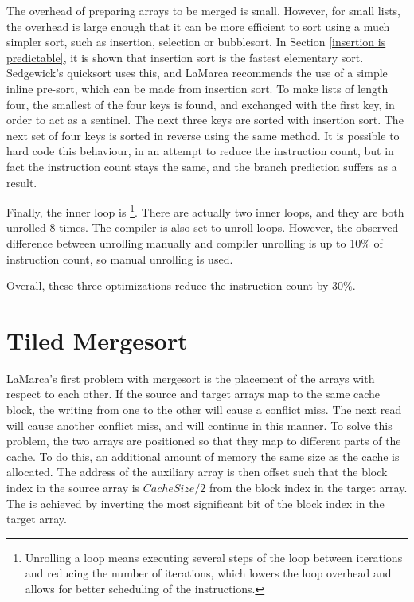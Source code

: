 The overhead of preparing arrays to be merged is small. However, for small
lists, the overhead is large enough that it can be more efficient to sort using
a much simpler sort, such as insertion, selection or bubblesort. In Section
\ref{insertion is predictable}, it is shown that insertion sort is the fastest
elementary sort.  Sedgewick's quicksort uses this, and LaMarca recommends the
use of a simple inline pre-sort, which can be made from insertion sort. To make
lists of length four, the smallest of the four keys is found, and exchanged
with the first key, in order to act as a sentinel. The next three keys are
sorted with insertion sort. The next set of four keys is sorted in reverse
using the same method. It is possible to hard code this behaviour, in an attempt
to reduce the instruction count, but in fact the instruction count stays the
same, and the branch prediction suffers as a result.

Finally, the inner loop is \footnote{Unrolling a loop means
executing several steps of the loop between iterations and reducing the number
of iterations, which lowers the loop overhead and allows for better scheduling
of the instructions.}. There are actually two inner loops, and they are both
unrolled 8 times. The compiler is also set to unroll loops. However, the
observed difference between unrolling manually and compiler unrolling is up to
10\% of instruction count, so manual unrolling is used.

Overall, these three optimizations reduce the instruction count by 30\%.

\section{Tiled Mergesort}
\label{tiled mergesort}
LaMarca's first problem with mergesort is the placement of the arrays with
respect to each other. If the source and target arrays map to the same cache
block, the writing from one to the other will cause a conflict miss. The next
read will cause another conflict miss, and will continue in this manner. To
solve this problem, the two arrays are positioned so that they map to different
parts of the cache. To do this, an additional amount of memory the same size as
the cache is allocated. The address of
the auxiliary array is then offset such that the block index in the source array
is $CacheSize/2$ from the block index in the target array. The is achieved by
inverting the most significant bit of the block index in the target array.

